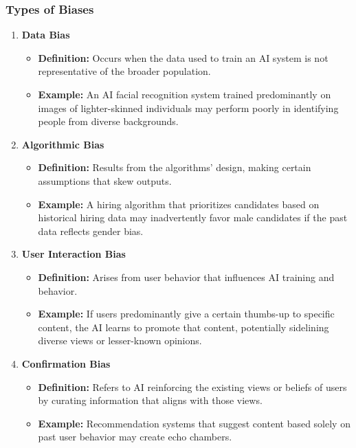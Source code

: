 \documentclass[aspectratio=169]{beamer}
\begin{document}
\begin{frame}[fragile]
  \frametitle{Types of Biases}
  \begin{enumerate}
    \item \textbf{Data Bias}
      \begin{itemize}
        \item \textbf{Definition:} Occurs when the data used to train an AI system is not representative of the broader population.
        \item \textbf{Example:} An AI facial recognition system trained predominantly on images of lighter-skinned individuals may perform poorly in identifying people from diverse backgrounds.
      \end{itemize}
      
    \item \textbf{Algorithmic Bias}
      \begin{itemize}
        \item \textbf{Definition:} Results from the algorithms’ design, making certain assumptions that skew outputs.
        \item \textbf{Example:} A hiring algorithm that prioritizes candidates based on historical hiring data may inadvertently favor male candidates if the past data reflects gender bias.
      \end{itemize}
  
    \item \textbf{User Interaction Bias}
      \begin{itemize}
        \item \textbf{Definition:} Arises from user behavior that influences AI training and behavior.
        \item \textbf{Example:} If users predominantly give a certain thumbs-up to specific content, the AI learns to promote that content, potentially sidelining diverse views or lesser-known opinions.
      \end{itemize}
      
    \item \textbf{Confirmation Bias}
      \begin{itemize}
        \item \textbf{Definition:} Refers to AI reinforcing the existing views or beliefs of users by curating information that aligns with those views.
        \item \textbf{Example:} Recommendation systems that suggest content based solely on past user behavior may create echo chambers.
      \end{itemize}
  \end{enumerate}
\end{frame}
\end{document}
